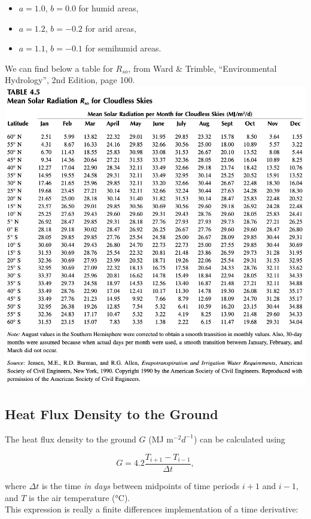 \documentclass[
  letterpaper,
  DIV=11,
  numbers=noendperiod]{scrreprt}
\providecommand{\tightlist}{%
  \setlength{\itemsep}{0pt}\setlength{\parskip}{0pt}}\usepackage{longtable,booktabs,array}
\begin{document}
\begin{itemize}
\tightlist
\item
  \(a=1.0\), \(b=0.0\) for humid areas,
\item
  \(a=1.2\), \(b=-0.2\) for arid areas,
\item
  \(a=1.1\), \(b=-0.1\) for semihumid areas.
\end{itemize}

We can find below a table for \(R_{so}\), from Ward \& Trimble,
``Environmental Hydrology'', 2nd Edition, page 100.
\includegraphics{archive/figures/trimble-table4.5.png}

\hypertarget{heat-flux-density-to-the-ground}{%
\subsection{Heat Flux Density to the
Ground}\label{heat-flux-density-to-the-ground}}

The heat flux density to the ground \(G\) (MJ m\(^{-2} d^{-1}\)) can be
calculated using

\[
  \begin{equation}
    G = 4.2\frac{T_{i+1}-T_{i-1}}{\Delta t},
  \end{equation}
\]

where \(\Delta t\) is the time \emph{in days} between midpoints of time
periods \(i+1\) and \(i−1\), and \(T\) is the air temperature (°C).\\
This expression is really a finite differences implementation of a time
derivative:
\end{document}
